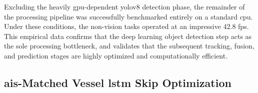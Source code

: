 \begin{table}[H]
\centering
\caption{Per-Module Processing Latency and End-to-End Pipeline Throughput (measured, \gls{cpu} mode)}
\label{c5:tab:latency}

\end{table}
\smallskip
{}

Excluding the heavily \gls{gpu}-dependent \gls{yolov8} detection phase, the remainder of the processing pipeline was successfully benchmarked entirely on a standard \gls{cpu}. Under these conditions, the non-vision tasks operated at an impressive 42.8 fps. This empirical data confirms that the deep learning object detection step acts as the sole processing bottleneck, and validates that the subsequent tracking, fusion, and prediction stages are highly optimized and computationally efficient.

\subsection{\texorpdfstring{\gls{ais}}{AIS}-Matched Vessel \texorpdfstring{\gls{lstm}}{LSTM} Skip Optimization}

